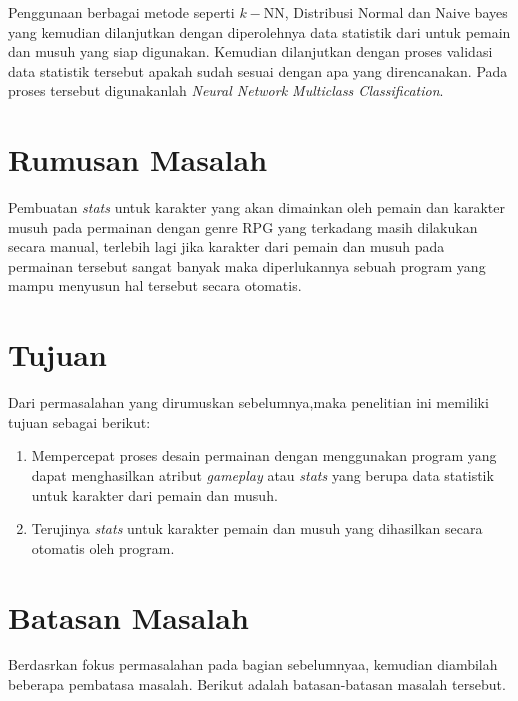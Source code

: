 Penggunaan berbagai metode seperti $k-$NN, Distribusi Normal dan Naive bayes yang kemudian dilanjutkan dengan diperolehnya data statistik dari untuk pemain dan musuh yang siap digunakan. Kemudian dilanjutkan dengan proses validasi data statistik tersebut apakah sudah sesuai dengan apa yang direncanakan. Pada proses tersebut digunakanlah \textit{Neural Network Multiclass Classification}.
\vspace{1ex}

\section{Rumusan Masalah}
\vspace{1ex}

Pembuatan \textit{stats} untuk karakter yang akan dimainkan oleh pemain dan karakter musuh pada permainan dengan genre RPG yang terkadang masih dilakukan secara manual, terlebih lagi jika karakter dari pemain dan musuh pada permainan tersebut sangat banyak maka diperlukannya sebuah program yang mampu menyusun hal tersebut secara otomatis.
\vspace{1ex}

\section{Tujuan}
\vspace{1ex}

Dari permasalahan yang dirumuskan sebelumnya,maka penelitian ini memiliki tujuan sebagai berikut: 

\begin{enumerate}
	\item Mempercepat proses desain permainan dengan menggunakan program yang dapat menghasilkan atribut \textit{gameplay} atau \textit{stats} yang berupa data statistik untuk karakter dari pemain dan musuh.

	\item Terujinya \textit{stats} untuk karakter pemain dan musuh yang dihasilkan secara otomatis oleh program.
\end{enumerate}

\section{Batasan Masalah}
\vspace{1ex}

Berdasrkan fokus permasalahan pada bagian sebelumnyaa, kemudian diambilah beberapa pembatasa masalah. Berikut adalah batasan-batasan masalah tersebut.

